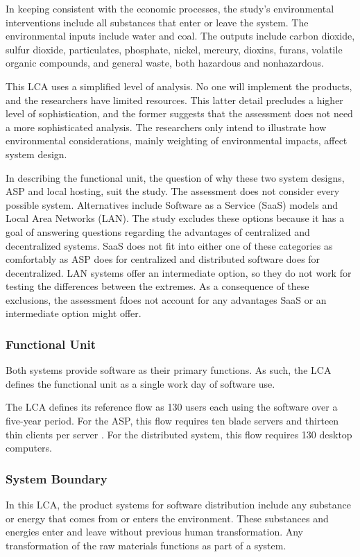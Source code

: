 \documentclass[final,journal,10pt,letterpaper,oneside,twocolumn,compsoc]%
{IEEEtran}
\begin{document}
In keeping consistent with the economic processes, the study's environmental
interventions
include all substances that enter or leave the system. The environmental inputs
include water and coal. The outputs include carbon dioxide, sulfur dioxide,
particulates, phosphate, nickel, mercury, dioxins, furans, volatile organic
compounds, and general waste, both hazardous and nonhazardous.

This LCA uses a simplified level of analysis. No one will implement the
products, and the researchers have limited resources. This latter detail
precludes
a higher level of sophistication, and the former suggests that the
assessment does not need a more sophisticated analysis. The researchers only
intend to illustrate how environmental considerations, mainly weighting of
environmental impacts, affect system design.

In describing the functional unit, the question of why these two system designs,
ASP and local hosting, suit the study. The assessment does not consider
every possible system. Alternatives include
Software as a Service (SaaS) models and Local Area Networks (LAN). The study
excludes
these options because it has a goal of answering questions regarding the
advantages of
centralized and decentralized systems. SaaS does not fit into either one of
these categories as comfortably as ASP does for centralized and distributed
software does for decentralized. LAN systems offer an intermediate option, so
they do not work for testing the differences between the extremes. As a
consequence
of these exclusions, the assessment fdoes not account for any advantages SaaS or
an intermediate option might offer.

\subsubsection{Functional Unit}
Both systems provide software as their primary functions.  As such, the LCA
defines the functional unit as a single work day of software use.

The LCA defines its reference flow as 130 users each using
the software over a five-year period. For the ASP,
this flow requires ten blade servers and thirteen thin clients per server
\cite{client}.
For the distributed system, this flow requires 130 desktop computers.

\subsubsection{System Boundary}
In this LCA, the product systems for software distribution
include any substance or energy that comes from or enters the
environment. These substances and energies enter and leave without previous
human transformation. Any transformation of the raw materials functions as part
of a system.
\end{document}

